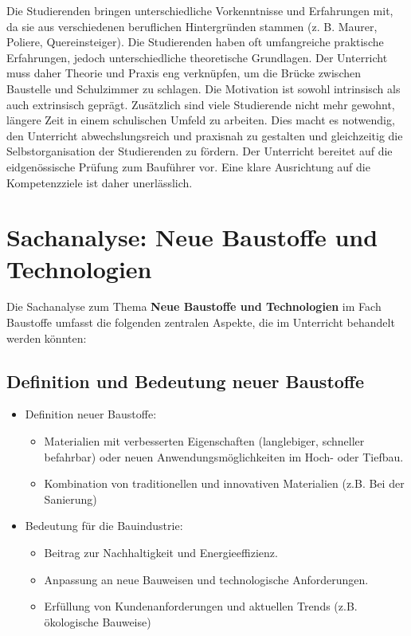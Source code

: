 \documentclass[
11pt,
captions=tableheading,
smallheadings,
headsepline,
footsepline, 
captions=tableheading,
parskip=half-,
]{scrartcl}
\begin{document}
Die Studierenden bringen unterschiedliche Vorkenntnisse und Erfahrungen mit, da sie aus verschiedenen beruflichen Hintergründen stammen (z. B. Maurer, Poliere, Quereinsteiger).
Die Studierenden haben oft umfangreiche praktische Erfahrungen, jedoch unterschiedliche theoretische Grundlagen. Der Unterricht muss daher Theorie und Praxis eng verknüpfen, um die Brücke zwischen Baustelle und Schulzimmer zu schlagen.
Die Motivation ist sowohl intrinsisch als auch extrinsisch geprägt. Zusätzlich sind viele Studierende nicht mehr gewohnt, längere Zeit in einem schulischen Umfeld zu arbeiten. Dies macht es notwendig, den Unterricht abwechslungsreich und praxisnah zu gestalten und gleichzeitig die Selbstorganisation der Studierenden zu fördern.
Der Unterricht bereitet auf die eidgenössische Prüfung zum Bauführer vor. Eine klare Ausrichtung auf die Kompetenzziele ist daher unerlässlich.



\section{Sachanalyse: Neue Baustoffe und Technologien}
\label{sec:Sachanalyse}

Die Sachanalyse zum Thema \textbf{Neue Baustoffe und Technologien} im Fach Baustoffe umfasst die folgenden zentralen Aspekte, die im Unterricht behandelt werden könnten:

\subsection{Definition und Bedeutung neuer Baustoffe}
\begin{itemize}
    \item Definition neuer Baustoffe:
          \begin{itemize}
              \item Materialien mit verbesserten Eigenschaften (langlebiger, schneller befahrbar) oder neuen Anwendungsmöglichkeiten im Hoch- oder Tiefbau.
              \item Kombination von traditionellen und innovativen Materialien (z.B. Bei der Sanierung)
          \end{itemize}
    \item Bedeutung für die Bauindustrie:
          \begin{itemize}
              \item Beitrag zur Nachhaltigkeit und Energieeffizienz.
              \item Anpassung an neue Bauweisen und technologische Anforderungen.
              \item Erfüllung von Kundenanforderungen und aktuellen Trends (z.B. ökologische Bauweise)
          \end{itemize}
\end{itemize}
\end{document}
